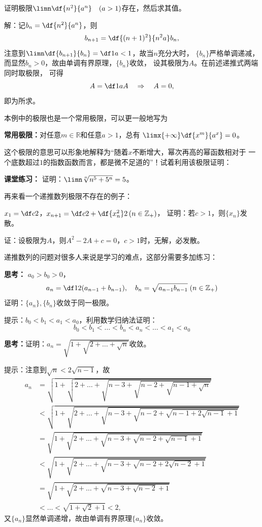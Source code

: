 \bs
\egz 证明极限$\limn\df{n^2}{a^n}\quad (a>1)$存在，然后求其值。

解：记$b_n=\df{n^2}{a^n}$，则
$$b_{n+1}=\df{(n+1)^2}{n^2a}b_n,$$
注意到$\limn\df{b_{n+1}}{b_n}=\df1a<1$，故当$n$充分大时，
$\{b_n\}$严格单调递减，
而显然$b_n>0$，故由单调有界原理，$\{b_n\}$收敛，
设其极限为$A$。在前述递推式两端同时取极限，
可得
$$A=\df1aA\quad\Rightarrow\quad A=0,$$
即为所求。\fin

本例中的极限也是一个常用极限，可以更一般地写为
\begin{thx}
	{\bf 常用极限：}对任意$m\in\mathbb{R}$和任意$a>1$，总有
	$\limx{+\infty}\df{x^m}{a^x}=0$。
\end{thx}
这个极限的意思可以形象地解释为“随着$x$不断增大，幂次再高的幂函数相对于
一个底数超过$1$的指数函数而言，都是微不足道的”！试着利用该极限证明：

{\bf 课堂练习：} 证明：$\limn\sqrt[n]{n^5+5^n}=5$。

\bs
再来看一个递推数列极限不存在的例子：

\egz $x_1=\df c2$，$x_{n+1}=\df c2+\df{x_n^2}2\,(n\in\mathbb{Z}_+)$，
证明：若$c>1$，则$\{x_n\}$发散。

证：设极限为$A$，则$A^2-2A+c=0$，$c>1$时，无解，必发散。\fin

\bs
递推数列的问题对很多人来说是学习的难点，这部分需要多加练习：

\bs
{\bf 思考：} $a_0>b_0>0$，
$$a_n=\df12(a_{n-1}+b_{n-1}),\quad
b_n=\sqrt{a_{n-1}b_{n-1}}\;(n\in\mathbb{Z}_+)$$
证明：$\{a_n\},\{b_n\}$收敛于同一极限。

\ifhint
提示：$b_0<b_1<a_1<a_0$，利用数学归纳法证明：
$$b_0<b_1<\ldots<b_n<a_n<\ldots<a_1<a_0$$
\fi

\bs
{\bf 思考：}证明：$a_n=\sqrt{1+\sqrt{2+\ldots+\sqrt{n}}}$收敛。

\ifhint
提示：注意到$\sqrt{n}<2\sqrt{n-1}$，故
\begin{align*}
	a_n&=\sqrt{1+\sqrt{2+\ldots
	+\sqrt{n-3+\sqrt{n-2+\sqrt{n-1+\sqrt{n}}}}}}\\
	&<\sqrt{1+\sqrt{2+\ldots
	+\sqrt{n-3+\sqrt{n-2+\sqrt{n-1+2\sqrt{n-1}+1}}}}}\\
	&=\sqrt{1+\sqrt{2+\ldots+\sqrt{n-3+\sqrt{n-2+\sqrt{n-1}+1}}}}\\
	&<\sqrt{1+\sqrt{2+\ldots+\sqrt{n-3+\sqrt{n-2+2\sqrt{n-2}+1}}}}\\
	&=\sqrt{1+\sqrt{2+\ldots+\sqrt{n-3+\sqrt{n-2}+1}}}\\
	&<\ldots<\sqrt{1+\sqrt2+1}<2,
\end{align*}
又$\{a_n\}$显然单调递增，故由单调有界原理$\{a_n\}$收敛。
\fi

